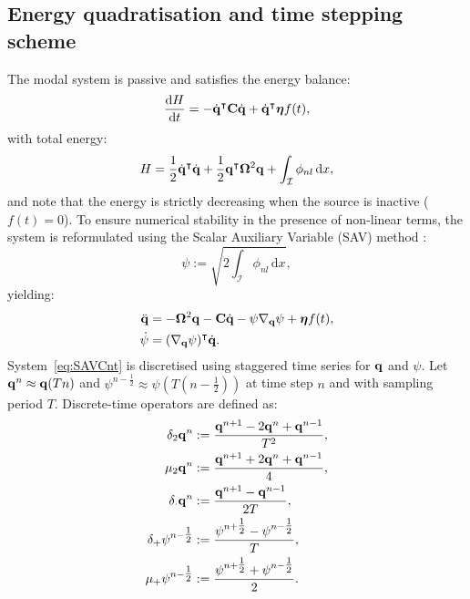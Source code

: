 \subsection{Energy quadratisation and time stepping scheme}
The modal system is passive and satisfies the energy balance:
\begin{equation}
\frac{\mathrm d H}{\mathrm dt} = -\dot {\bf q}^{\intercal}{\bf C}\dot{\bf q} + \dot{\bf q}^{\intercal}{\boldsymbol \eta} f(t),
\end{equation}
with total energy:
\begin{equation}
H = \frac{1}{2} \dot{\bf q}^{\intercal} \dot{\bf q} + \frac{1}{2} {\bf q}^{\intercal} {\bf \Omega}^2 {\bf q} + \int_{\mathcal I} \phi_{nl}\,\mathrm dx,
\end{equation}
and note that the energy is strictly decreasing when the source is inactive ($f(t) = 0$). To ensure numerical stability in the presence of non-linear terms, the system is reformulated using the Scalar Auxiliary Variable (SAV) method \cite{bilbao_explicit_2023, van-walstijn_real-time_2016}:
\begin{equation}
\psi := \sqrt{2 \int_{\mathcal I} \phi_{nl}\,\mathrm dx},
\end{equation}
yielding:
\begin{subequations}\label{eq:SAVCnt}
\begin{align}
   \ddot {\bf q} &= -{\bf \Omega}^2{\bf q} - {\bf C}\dot{\bf q} - \psi \nabla_{\bf q}\psi + {\boldsymbol \eta} f(t), \\
   \dot \psi &=  (\nabla_{\bf q}\psi)^\intercal \dot {\bf q}.
\end{align}
\end{subequations}
System~\eqref{eq:SAVCnt} is discretised using staggered time series for ${\bf q}$ and $\psi$. Let ${\bf q}^n \approx {\bf q}(Tn)$ and $\psi^{n-\tfrac{1}{2}} \approx \psi(T(n - \tfrac{1}{2}))$ at time step $n$ and with sampling period $T$. Discrete-time operators are defined as:
\begin{subequations}
\begin{align}
\delta_{2} {\bf q}^n &:= \frac{{\bf q}^{n+1} - 2{\bf q}^n + {\bf q}^{n-1}}{T^2}, \\
\mu_{2} {\bf q}^n &:= \frac{{\bf q}^{n+1} + 2{\bf q}^n + {\bf q}^{n-1}}{4}, \\
\delta_{\cdot} {\bf q}^n &:= \frac{{\bf q}^{n+1} - {\bf q}^{n-1}}{2T}, \\
\delta_{+} \psi^{n-\tfrac{1}{2}} &:= \frac{\psi^{n+\tfrac{1}{2}} - \psi^{n-\tfrac{1}{2}}}{T}, \\
\mu_{+} \psi^{n-\tfrac{1}{2}} &:= \frac{\psi^{n+\tfrac{1}{2}} + \psi^{n-\tfrac{1}{2}}}{2}.
\end{align}
\end{subequations}
